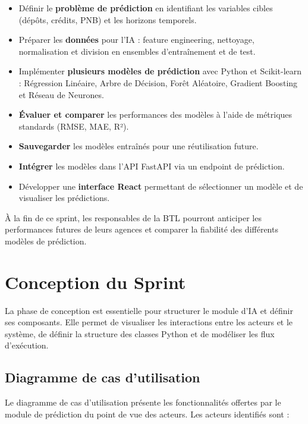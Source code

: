 \begin{itemize}
    \item Définir le \textbf{problème de prédiction} en identifiant les variables cibles (dépôts, crédits, PNB) et les horizons temporels.
    \item Préparer les \textbf{données} pour l'IA : feature engineering, nettoyage, normalisation et division en ensembles d'entraînement et de test.
    \item Implémenter \textbf{plusieurs modèles de prédiction} avec Python et Scikit-learn : Régression Linéaire, Arbre de Décision, Forêt Aléatoire, Gradient Boosting et Réseau de Neurones.
    \item \textbf{Évaluer et comparer} les performances des modèles à l'aide de métriques standards (RMSE, MAE, R²).
    \item \textbf{Sauvegarder} les modèles entraînés pour une réutilisation future.
    \item \textbf{Intégrer} les modèles dans l'API FastAPI via un endpoint de prédiction.
    \item Développer une \textbf{interface React} permettant de sélectionner un modèle et de visualiser les prédictions.
\end{itemize}

À la fin de ce sprint, les responsables de la BTL pourront anticiper les performances futures de leurs agences et comparer la fiabilité des différents modèles de prédiction.

\section{Conception du Sprint}
\label{sec:sprint5-conception}

La phase de conception est essentielle pour structurer le module d'IA et définir ses composants. Elle permet de visualiser les interactions entre les acteurs et le système, de définir la structure des classes Python et de modéliser les flux d'exécution.

\subsection{Diagramme de cas d'utilisation}
\label{subsec:sprint5-use-case}

Le diagramme de cas d'utilisation présente les fonctionnalités offertes par le module de prédiction du point de vue des acteurs. Les acteurs identifiés sont :

